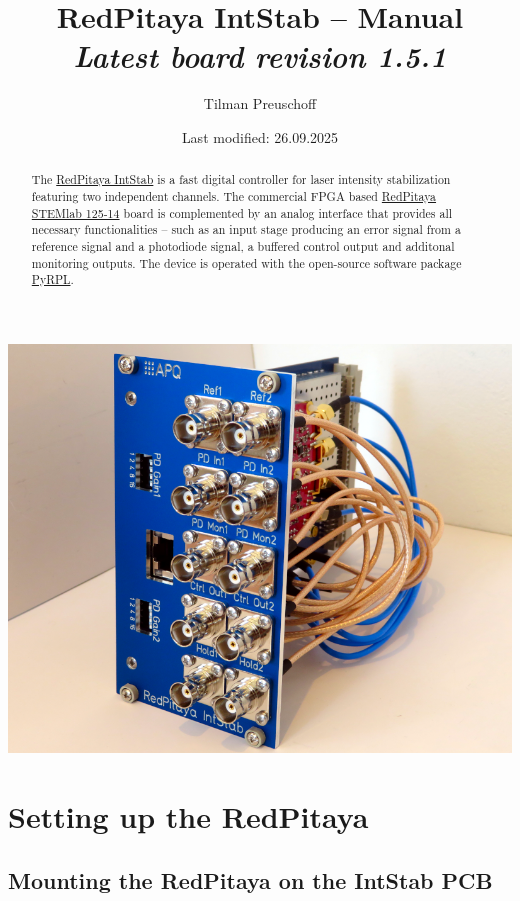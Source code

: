\documentclass[twoside,a4paper]{refart}
\title{RedPitaya IntStab -- Manual\\
	\textit{\normalsize{Latest board revision 1.5.1}}}
\author{Tilman Preuschoff}
\date{Last modified: 26.09.2025}
\begin{document}
\maketitle
\begin{maxipage}
	\includegraphics[width=\textwidth]{fig/intstab.png}
\end{maxipage}
\begin{abstract}
	The \href{https://github.com/TU-Darmstadt-APQ/RedPitaya-IntStab}{RedPitaya IntStab} is a fast digital controller for laser intensity stabilization featuring two independent channels. The commercial FPGA based \href{https://www.redpitaya.com/f130/STEMlab-board}{RedPitaya STEMlab 125-14} board is complemented by an analog interface that provides all necessary functionalities -- such as an input stage producing an error signal from a reference signal and a photodiode signal, a buffered control output and additonal monitoring outputs. The device is operated with the open-source software package \href{https://pyrpl.readthedocs.io/en/latest/}{PyRPL}.  
\end{abstract}
\tableofcontents


\section{Setting up the RedPitaya}

\subsection{Mounting the RedPitaya on the IntStab PCB}
\end{document}
